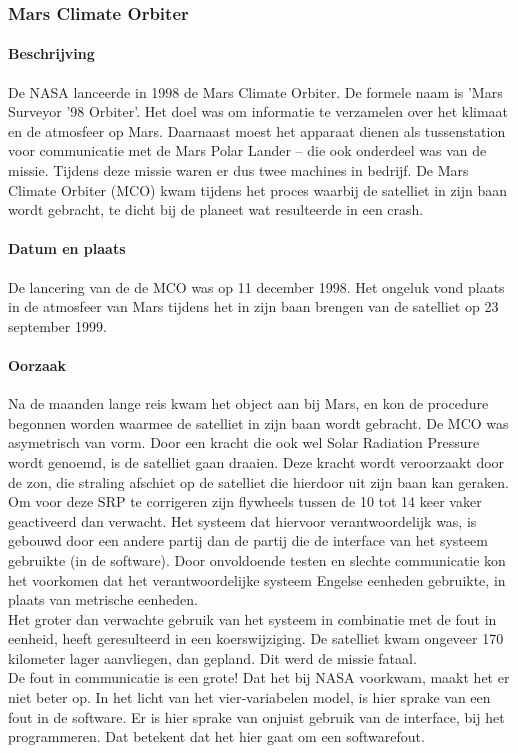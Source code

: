 \documentclass{article}
\begin{document}
			\subsubsection{Mars Climate Orbiter}

				\paragraph{Beschrijving}

					De NASA lanceerde in 1998 de Mars Climate Orbiter. De formele naam is 'Mars Surveyor '98 Orbiter'. Het doel was om informatie te verzamelen over het klimaat en de atmosfeer op Mars. Daarnaast moest het apparaat dienen als tussenstation voor communicatie met de Mars Polar Lander -- die ook onderdeel was van de missie. Tijdens deze missie waren er dus twee machines in bedrijf. De Mars Climate Orbiter (MCO) kwam tijdens het proces waarbij de satelliet in zijn baan wordt gebracht, te dicht bij de planeet wat resulteerde in een crash.

				\paragraph{Datum en plaats}

					De lancering van de de MCO was op 11 december 1998. Het ongeluk vond plaats in de atmosfeer van Mars tijdens het in zijn baan brengen van de satelliet op 23 september 1999.

				\paragraph{Oorzaak}

					Na de maanden lange reis kwam het object aan bij Mars, en kon de procedure begonnen worden waarmee de satelliet in zijn baan wordt gebracht. De MCO was asymetrisch van vorm. Door een kracht die ook wel Solar Radiation Pressure wordt genoemd, is de satelliet gaan draaien. Deze kracht wordt veroorzaakt door de zon, die straling afschiet op de satelliet die hierdoor uit zijn baan kan geraken. \cite{yousef2022balancing} Om voor deze SRP te corrigeren zijn flywheels tussen de 10 tot 14 keer vaker geactiveerd dan verwacht. Het systeem dat hiervoor verantwoordelijk was, is gebouwd door een andere partij dan de partij die de interface van het systeem gebruikte (in de software). Door onvoldoende testen en slechte communicatie kon het voorkomen dat het verantwoordelijke systeem Engelse eenheden gebruikte, in plaats van metrische eenheden. \\
					Het groter dan verwachte gebruik van het systeem in combinatie met de fout in eenheid, heeft geresulteerd in een koerswijziging. De satelliet kwam ongeveer 170 kilometer lager aanvliegen, dan gepland. Dit werd de missie fataal. \cite{stephenson1999mars} \\
					De fout in communicatie is een grote! Dat het bij NASA voorkwam, maakt het er niet beter op. In het licht van het vier-variabelen model, is hier sprake van een fout in de software. Er is hier sprake van onjuist gebruik van de interface, bij het programmeren. Dat betekent dat het hier gaat om een softwarefout.
		
\end{document}
